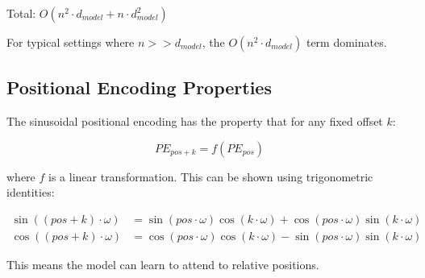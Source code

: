 Total: $O(n^2 \cdot d_{model} + n \cdot d_{model}^2)$

For typical settings where $n >> d_{model}$, the $O(n^2 \cdot d_{model})$ term dominates.

\subsection{Positional Encoding Properties}

The sinusoidal positional encoding has the property that for any fixed offset $k$:

\begin{equation}
PE_{pos+k} = f(PE_{pos})
\end{equation}

where $f$ is a linear transformation. This can be shown using trigonometric identities:

\begin{align}
\sin((pos + k) \cdot \omega) &= \sin(pos \cdot \omega)\cos(k \cdot \omega) + \cos(pos \cdot \omega)\sin(k \cdot \omega) \\
\cos((pos + k) \cdot \omega) &= \cos(pos \cdot \omega)\cos(k \cdot \omega) - \sin(pos \cdot \omega)\sin(k \cdot \omega)
\end{align}

This means the model can learn to attend to relative positions.

